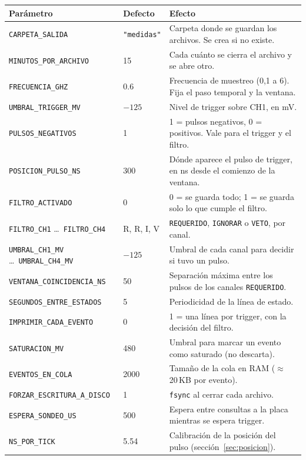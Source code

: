 \documentclass[11pt,a4paper]{article}
\newcommand{\code}[1]{\texttt{#1}}
\begin{document}
\begin{center}
\small
\begin{longtable}{p{4.6cm}p{2.0cm}p{8.0cm}}
\toprule
Parámetro & Defecto & Efecto \\
\midrule
\endhead
\code{CARPETA\_SALIDA} & \code{"medidas"} & Carpeta donde se guardan los archivos. Se crea si no existe. \\
\code{MINUTOS\_POR\_ARCHIVO} & 15 & Cada cuánto se cierra el archivo y se abre otro. \\
\code{FRECUENCIA\_GHZ} & 0.6 & Frecuencia de muestreo (0{,}1 a 6). Fija el paso temporal y la ventana. \\
\code{UMBRAL\_TRIGGER\_MV} & $-125$ & Nivel de trigger sobre CH1, en mV. \\
\code{PULSOS\_NEGATIVOS} & 1 & 1 = pulsos negativos, 0 = positivos. Vale para el trigger y el filtro. \\
\code{POSICION\_PULSO\_NS} & 300 & Dónde aparece el pulso de trigger, en ns desde el comienzo de la ventana. \\
\code{FILTRO\_ACTIVADO} & 0 & 0 = se guarda todo; 1 = se guarda solo lo que cumple el filtro. \\
\code{FILTRO\_CH1} \ldots\ \code{FILTRO\_CH4} & R, R, I, V & \code{REQUERIDO}, \code{IGNORAR} o \code{VETO}, por canal. \\
\code{UMBRAL\_CH1\_MV} \ldots\ \code{UMBRAL\_CH4\_MV} & $-125$ & Umbral de cada canal para decidir si tuvo un pulso. \\
\code{VENTANA\_COINCIDENCIA\_NS} & 50 & Separación máxima entre los pulsos de los canales \code{REQUERIDO}. \\
\code{SEGUNDOS\_ENTRE\_ESTADOS} & 5 & Periodicidad de la línea de estado. \\
\code{IMPRIMIR\_CADA\_EVENTO} & 0 & 1 = una línea por trigger, con la decisión del filtro. \\
\code{SATURACION\_MV} & 480 & Umbral para marcar un evento como saturado (no descarta). \\
\code{EVENTOS\_EN\_COLA} & 2000 & Tamaño de la cola en RAM ($\approx$ 20\,KB por evento). \\
\code{FORZAR\_ESCRITURA\_A\_DISCO} & 1 & \code{fsync} al cerrar cada archivo. \\
\code{ESPERA\_SONDEO\_US} & 500 & Espera entre consultas a la placa mientras se espera trigger. \\
\code{NS\_POR\_TICK} & 5.54 & Calibración de la posición del pulso (sección~\ref{sec:posicion}). \\
\bottomrule
\end{longtable}
\end{center}
\end{document}
